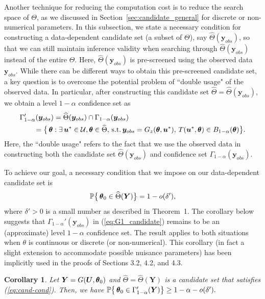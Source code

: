 \documentclass[12pt]{article}
\theoremstyle{shortspace}
\newtheorem{corollary}{Corollary}
\def\*#1{\bm{#1}}
\def\btheta{\mathop{\theta\kern-.45em\hbox{$\theta$}}\nolimits}
\def\P{\mathbb P}
\begin{document}
Another technique for reducing the computation cost 
is to reduce the search space of $\Theta$, as we discussed in Section~\ref{sec:candidate_general} for discrete or non-numerical parameters. In this subsection, we state a necessary condition for 
constructing a data-dependent candidate set (a subset of $\Theta$), say 
$\widehat \Theta(\*y_{obs})$, so that we can still maintain inference validity when searching through  $\widehat \Theta(\*y_{obs})$ instead of the entire $\Theta$. 
Here, $\widehat \Theta(\*y_{obs})$ is pre-screened using the observed data $\*y_{obs}$. 
While there can be different ways to obtain this pre-screened candidate set, a key question 
is to overcome the potential problem of ``double usage" of the observed data.
In particular, 
after constructing this candidate set $\widehat \Theta = \widehat \Theta(\*y_{obs})$, we obtain a level $1 - \alpha$ confidence set as
\begin{align}
\label{eq:G1_candidate}
& \Gamma_{1-\alpha}'(\*y_{obs})   = \widehat \Theta(\*y_{obs}) \cap \Gamma_{1-\alpha}(\*y_{obs}) \nonumber \\
& \qquad = \big\{\btheta:  \exists \, \*u^* \in {\mathcal U}, \btheta \in \widehat\Theta,  \, \hbox{s.t.} \, \*y_{obs} = 
G_z({\btheta}, \*u^*),
\, 
T(\*u^*, \btheta)  \in B_{1 - \alpha}(\btheta)  \big\}.
\end{align}
Here, the ``double usage" refers to the fact that we use the observed data in constructing both the candidate set $\widehat \Theta(\*y_{obs})$ and confidence set $\Gamma_{1-\alpha}(\*y_{obs})$. 


To achieve our goal, a necessary condition that we impose on our data-dependent candidate set is
\begin{equation} \label{eq:cand-cond}
    \P\big\{ \btheta_0 \in \widehat \Theta(\*Y)\big\} = 1 - o(\delta'),
\end{equation}
where $\delta' > 0$ is a small number as described in Theorem~1. %
The corollary below 
suggests that  $\Gamma_{1-\alpha}'(\*y_{obs})$ in (\ref{eq:G1_candidate})
remains to be an (approximate) level $1 - \alpha$ confidence set. The result applies to both situations when $\theta$ is continuous or discrete (or non-numerical). This corollary (in fact a slight extension to accommodate possible nuisance parameters) has been implicitly used in the proofs of Sections 3.2, 4.2, and 4.3.  


\begin{corollary}
\label{cor:cand_cs_coverage}
Let $\*Y= G(\*U, \btheta_0)$ and $\widehat\Theta = \widehat\Theta(\*Y)$ is a candidate set that satisfies (\ref{eq:cand-cond}).  
Then, we have 
$\P\big\{\btheta_0 \in \Gamma_{1-\alpha}'(\*Y)\big\} \geq 1 - \alpha - o(\delta').$
\end{corollary}
\end{document}
